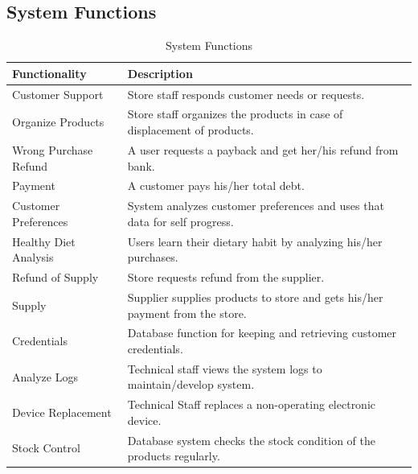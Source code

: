 \subsection{System Functions}

 \begin{table}[H]
     \centering
     \begin{tabular}{ | l | p{10cm} |}
     \hline
     \textbf{Functionality}    & \textbf{Description} \\
     \hline
     Customer Support          & Store staff responds customer needs or requests. \\
     \hline
     Organize Products         & Store staff organizes the products in case of displacement of products. \\ 
     \hline
     Wrong Purchase Refund   &  A user requests a payback and get her/his refund from bank. \\
     \hline
     Payment                  & A customer pays his/her total debt. \\
     \hline
     Customer Preferences     & System analyzes customer preferences and uses that data for self progress. \\
     \hline
     Healthy Diet Analysis    & Users learn their dietary habit by analyzing his/her purchases. \\
     \hline
     Refund of Supply       & Store requests refund from the supplier.  \\
     \hline
     Supply  & Supplier supplies products to store and gets his/her payment from the store.\\
     \hline
     Credentials & Database function for keeping and retrieving customer credentials.\\
     \hline
     Analyze Logs & Technical staff views the system logs to maintain/develop system.\\
     \hline
     Device Replacement & Technical Staff replaces a non-operating electronic device. \\
     \hline
     Stock Control & Database system checks the stock condition of the products regularly.\\
     \hline
     \end{tabular} \caption{System Functions}
     \label{tab:01system_functions}
 \end{table}

